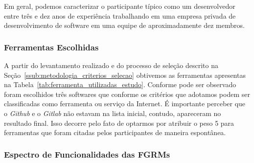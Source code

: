 Em geral, podemos caracterizar o participante típico como um desenvolvedor entre
três e dez anos de experiência trabalhando em uma empresa privada de
desenvolvimento de software em uma equipe de aproximadamente dez membros.

\subsubsection{Ferramentas Escolhidas}
\label{subsec:resultados_ferramentas_escolhidas}

A partir do levantamento realizado e do processo de seleção descrito na
Seção~\ref{ssub:metodologia_criterios_selecao} obtivemos as ferramentas
apresentas na Tabela~\ref{tab:ferramenta_utilizadas_estudo}. Conforme pode ser
observado foram escolhidos três softwares que conforme os critérios que adotamos
podem ser classificadas como ferramenta ou serviço da Internet. É importante
perceber que o \textit{Github} e o \textit{Gitlab} não estavam na lista inicial,
contudo, apareceram no resultado final. Isso decorre pelo fato de optarmos por
atribuir o peso 5 para ferramentas que foram citadas pelos participantes de
maneira espontânea.

\begin{table}[htpb]
\centering
{}
\caption{Ferramentas utilizados no estudo}
\label{tab:ferramenta_utilizadas_estudo}
\end{table}


\subsubsection{Espectro de Funcionalidades das FGRMs}
\label{subsec:categorizacao_ferramentas}

